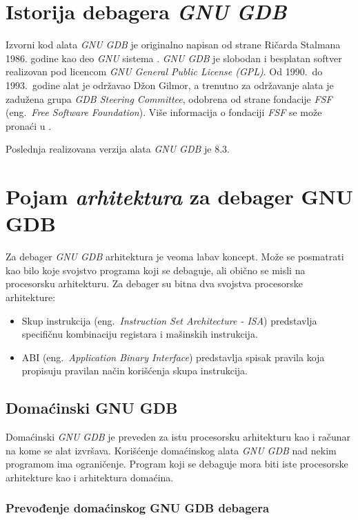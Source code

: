 \documentclass[12pt,oneside]{memoir}
\begin{document}
\section{Istorija debagera \emph{GNU GDB}}

Izvorni kod alata \emph{GNU GDB} je originalno napisan od strane Ričarda Stalmana 1986. godine kao deo \emph{GNU} sistema \cite{GDBDOC}. \emph{GNU GDB} je slobodan i besplatan softver realizovan pod licencom \emph{GNU General Public License (GPL)}. Od 1990.~do 1993.~godine alat je održavao Džon Gilmor, a trenutno za održavanje alata je zadužena grupa \emph{GDB Steering Committee}, odobrena od strane fondacije \emph{FSF} (eng.~\emph{Free Software Foundation}). Više informacija o fondaciji \emph{FSF} se može pronaći u \cite{FSF}.

Poslednja realizovana verzija alata \emph{GNU GDB} je 8.3.

\section{Pojam \emph{arhitektura} za debager GNU GDB}

Za debager \emph{GNU GDB} arhitektura je veoma labav koncept. Može se posmatrati kao bilo koje svojstvo programa koji se debaguje, ali obično se misli na procesorsku arhitekturu. Za debager su bitna dva svojstva procesorske arhitekture:

\begin{itemize}
	\item Skup instrukcija (eng.~\emph{Instruction Set Architecture - ISA}) predstavlja specifičnu kombinaciju registara i mašinskih instrukcija.
	\item ABI (eng.~\emph{Application Binary Interface}) predstavlja spisak pravila koja propisuju pravilan način korišćenja skupa instrukcija.
\end{itemize}

\subsection{Domaćinski GNU GDB}

Domaćinski \emph{GNU GDB} je preveden za istu procesorsku arhitekturu kao i računar na kome se alat izvršava. Korišćenje domaćinskog alata \emph{GNU GDB} nad nekim programom ima ograničenje. Program koji se debaguje mora biti iste procesorske arhitekture kao i arhitektura domaćina.

\subsubsection{Prevođenje domaćinskog GNU GDB debagera}
\end{document}
